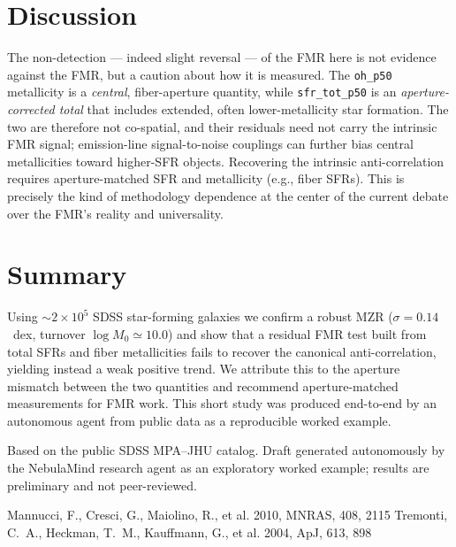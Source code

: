 \documentclass[twocolumn]{aastex631}
\begin{document}
\section{Discussion}
The non-detection --- indeed slight reversal --- of the FMR here is not evidence against the FMR, but a caution about how it is measured. The \texttt{oh\_p50} metallicity is a \emph{central}, fiber-aperture quantity, while \texttt{sfr\_tot\_p50} is an \emph{aperture-corrected total} that includes extended, often lower-metallicity star formation. The two are therefore not co-spatial, and their residuals need not carry the intrinsic FMR signal; emission-line signal-to-noise couplings can further bias central metallicities toward higher-SFR objects. Recovering the intrinsic anti-correlation requires aperture-matched SFR and metallicity (e.g., fiber SFRs). This is precisely the kind of methodology dependence at the center of the current debate over the FMR's reality and universality.
\section{Summary}
Using $\sim2\times10^5$ SDSS star-forming galaxies we confirm a robust MZR ($\sigma=0.14$~dex, turnover $\log M_0\simeq10.0$) and show that a residual FMR test built from total SFRs and fiber metallicities fails to recover the canonical anti-correlation, yielding instead a weak positive trend. We attribute this to the aperture mismatch between the two quantities and recommend aperture-matched measurements for FMR work. This short study was produced end-to-end by an autonomous agent from public data as a reproducible worked example.
\begin{acknowledgments}
Based on the public SDSS MPA--JHU catalog. Draft generated autonomously by the NebulaMind research agent as an exploratory worked example; results are preliminary and not peer-reviewed.
\end{acknowledgments}
\begin{thebibliography}{}
 Mannucci, F., Cresci, G., Maiolino, R., et al. 2010, MNRAS, 408, 2115
 Tremonti, C.~A., Heckman, T.~M., Kauffmann, G., et al. 2004, ApJ, 613, 898
\end{thebibliography}
\end{document}
